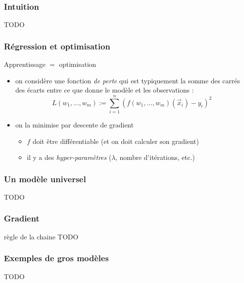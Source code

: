 \documentclass{beamer}
\begin{document}
\begin{frame}
  \frametitle{Intuition}

  TODO
  
\end{frame}

\begin{frame}
  \frametitle{Régression et optimisation}

  \begin{block}{Apprentissage $=$ optimisation}

    \begin{itemize}
    \item on considère une fonction \emph{de perte} qui
      est typiquement la somme des carrés des écarts entre ce que
      donne le modèle et les observations :
      \[ L(w_1, \dots, w_m) :=
      \sum_{i=1}^n (f(w_1, \dots, w_m)(\vec{x}_i) - y_i)^2 \]
    \item on la minimise par descente de gradient
      \begin{itemize}
      \item $f$ doit être différentiable (et on doit calculer son gradient)
      \item il y a des \emph{hyper-paramètres} ($\lambda$, nombre d'itérations, etc.)
      \end{itemize}
    \end{itemize}

  \end{block}
  
\end{frame}

\begin{frame}
  \frametitle{Un modèle universel}

TODO
  
\end{frame}

\begin{frame}
  \frametitle{Gradient}

  règle de la chaine
TODO
  
\end{frame}

\begin{frame}
  \frametitle{Exemples de gros modèles}

TODO
  
\end{frame}
\end{document}
